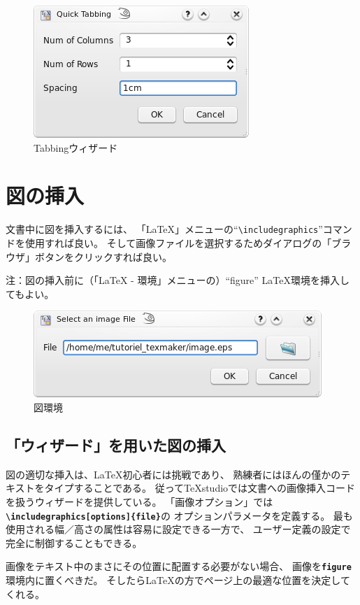 \begin{figure}[H]
  \centering
  \includegraphics{doc8.png}
  \caption{Tabbingウィザード}
\end{figure}

\section{図の挿入}

文書中に図を挿入するには、
「LaTeX」メニューの``\verb+\includegraphics+''コマンドを使用すれば良い。
そして画像ファイルを選択するためダイアログの「ブラウザ」ボタンをクリックすれば良い。

注：図の挿入前に（「LaTeX - 環境」メニューの）``figure'' LaTeX環境を挿入してもよい。

\begin{figure}[H]
  \centering
  \includegraphics{doc9.png}
  \caption{図環境}
\end{figure}

\subsection{「ウィザード」を用いた図の挿入}

図の適切な挿入は、LaTeX初心者には挑戦であり、
熟練者にはほんの僅かのテキストをタイプすることである。
従ってTeXstudioでは文書への画像挿入コードを扱うウィザードを提供している。
「画像オプション」では
\textbf{\texttt{\textbackslash{}includegraphics[options]\{file\}}}の
オプションパラメータを定義する。
最も使用される幅／高さの属性は容易に設定できる一方で、
ユーザー定義の設定で完全に制御することもできる。

画像をテキスト中のまさにその位置に配置する必要がない場合、
画像を\textbf{\texttt{figure}}環境内に置くべきだ。
そしたらLaTeXの方でページ上の最適な位置を決定してくれる。

